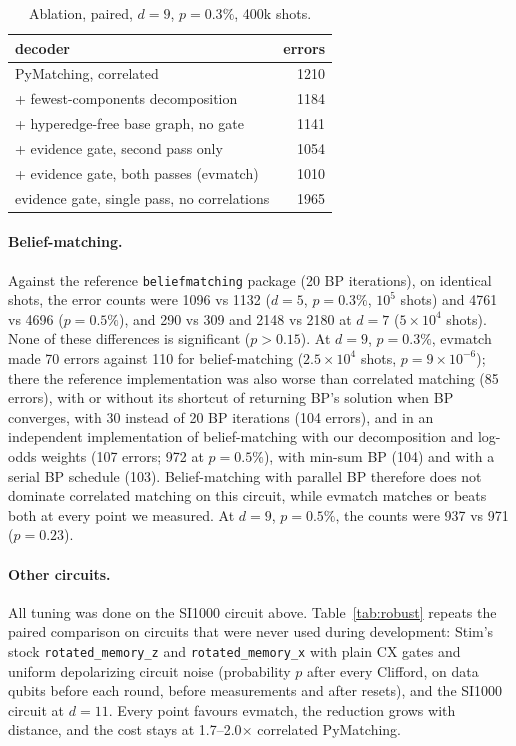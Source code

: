 \documentclass[aps,pra,twocolumn,superscriptaddress,nofootinbib]{revtex4-2}
\begin{document}
\begin{table}[t]
\caption{Ablation, paired, $d=9$, $p=0.3\%$, 400k shots.}
\label{tab:ablation}
\begin{tabular}{lr}
\toprule
decoder & errors \\
\midrule
PyMatching, correlated & 1210 \\
\quad + fewest-components decomposition & 1184 \\
\quad + hyperedge-free base graph, no gate & 1141 \\
\quad + evidence gate, second pass only & 1054 \\
\quad + evidence gate, both passes (evmatch) & 1010 \\
evidence gate, single pass, no correlations & 1965 \\
\bottomrule
\end{tabular}
\end{table}

\paragraph{Belief-matching.} Against the reference \texttt{beliefmatching}
package (20 BP iterations), on identical shots, the error counts were
1096 vs 1132 ($d=5$, $p=0.3\%$, $10^5$ shots) and 4761 vs 4696 ($p=0.5\%$),
and 290 vs 309 and 2148 vs 2180 at $d=7$ ($5\times10^4$ shots). None of these
differences is significant ($p>0.15$). At $d=9$, $p=0.3\%$, evmatch made 70
errors against 110 for belief-matching ($2.5\times10^4$ shots, $p=9\times10^{-6}$);
there the reference implementation was also worse than correlated matching
(85 errors), with or without its shortcut of returning BP's solution when BP
converges, with 30 instead of 20 BP iterations (104 errors), and in an
independent implementation of belief-matching with our decomposition and
log-odds weights (107 errors; 972 at $p=0.5\%$), with min-sum BP (104) and
with a serial BP schedule (103). Belief-matching with
parallel BP therefore does not dominate correlated matching on this circuit,
while evmatch matches or beats both at every point we measured. At $d=9$, $p=0.5\%$, the counts were 937 vs 971 ($p=0.23$).

\paragraph{Other circuits.} All tuning was done on the SI1000 circuit above. Table~\ref{tab:robust} repeats the
paired comparison on circuits that were never used during development: Stim's stock \texttt{rotated\_memory\_z}
and \texttt{rotated\_memory\_x} with plain CX gates and uniform depolarizing circuit noise (probability $p$ after
every Clifford, on data qubits before each round, before measurements and after resets), and the SI1000 circuit
at $d=11$. Every point favours evmatch, the reduction grows with distance, and the cost stays at 1.7--2.0$\times$
correlated PyMatching.
\end{document}
